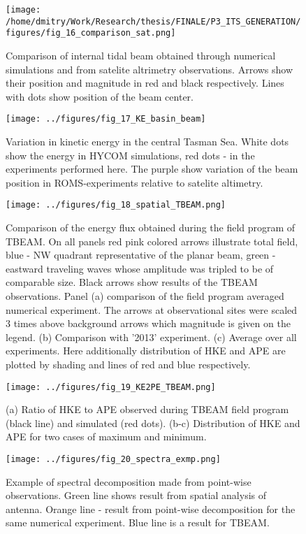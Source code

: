 \documentclass[12pt]{article}
\begin{document}
\begin{figure}
	\centering
	\texttt{[image: /home/dmitry/Work/Research/thesis/FINALE/P3\_ITS\_GENERATION/figures/fig\_16\_comparison\_sat.png]}
	\caption{Comparison of internal tidal beam obtained through numerical simulations and from 
	satelite altrimetry observations. Arrows show their position and magnitude in red and black 
	respectively. Lines with dots show position of the beam center.}
	\label{C3.fig:cmp_sat_nexp}
\end{figure}

\begin{figure}
\centering
\texttt{[image: ../figures/fig\_17\_KE\_basin\_beam]}
\caption{Variation in kinetic energy in the central Tasman Sea. White dots show the energy in HYCOM 
simulations, red dots - in the experiments performed here. The purple show variation of the beam 
position in ROMS-experiments relative to satelite altimetry. }
\label{C3.fig:KE_beam}
\end{figure}

\begin{figure}
	\centering
	\texttt{[image: ../figures/fig\_18\_spatial\_TBEAM.png]}
	\caption{Comparison of the energy flux obtained during the field program of TBEAM. On all 
	panels red pink colored arrows illustrate total field, blue - NW quadrant representative of the 
	planar beam, green - eastward traveling waves whose amplitude was tripled to be of comparable 
	size. Black arrows show results of the TBEAM observations. Panel (a) comparison of the field 
	program averaged numerical experiment. The arrows at observational sites were scaled 3 times 
	above background arrows which magnitude is given on the legend. (b) Comparison with '2013' 
	experiment. (c) Average over all experiments. Here additionally distribution of HKE and APE are 
	plotted by shading and lines of red and blue respectively.}
	\label{C3.fig:TBEAM_sp}
\end{figure}

\begin{figure}
	\centering
	\texttt{[image: ../figures/fig\_19\_KE2PE\_TBEAM.png]}
	\caption{(a) Ratio of HKE to APE observed during TBEAM field program (black line) and simulated 
	(red dots). (b-c) Distribution of HKE and APE for two cases of maximum and minimum.}
	\label{C3.fig:TBEAM_KE2PE}
\end{figure}

\begin{figure}
	\centering
	\texttt{[image: ../figures/fig\_20\_spectra\_exmp.png]}
	\caption{Example of spectral decomposition made from point-wise observations. Green line shows 
	result from spatial analysis of antenna. Orange line - result from point-wise decomposition for 
	the same numerical experiment. Blue line is a result for TBEAM.}
	\label{C3.fig:ex_spectra}
\end{figure}
\end{document}
